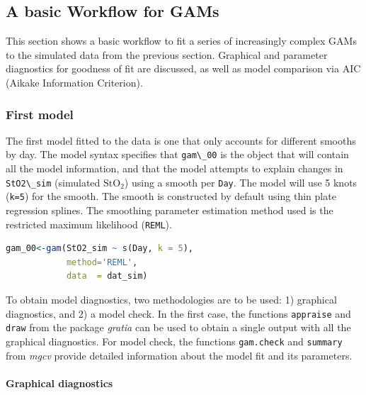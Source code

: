 \documentclass[
]{article}
\newcommand{\passthrough}[1]{#1}
\begin{document}
\hypertarget{workflow}{%
\subsection{A basic Workflow for GAMs}\label{workflow}}

This section shows a basic workflow to fit a series of increasingly complex GAMs to the simulated data from the previous section. Graphical and parameter diagnostics for goodness of fit are discussed, as well as model comparison via AIC (Aikake Information Criterion).

\hypertarget{first-model}{%
\subsubsection{First model}\label{first-model}}

The first model fitted to the data is one that only accounts for different smooths by day. The model syntax specifies that \passthrough{\lstinline!gam\_00!} is the object that will contain all the model information, and that the model attempts to explain changes in \passthrough{\lstinline!StO2\_sim!} (simulated \(\mbox{StO}_2\)) using a smooth per \passthrough{\lstinline!Day!}. The model will use 5 knots (\passthrough{\lstinline!k=5!}) for the smooth. The smooth is constructed by default using thin plate regression splines. The smoothing parameter estimation method used is the restricted maximum likelihood (\passthrough{\lstinline!REML!}).

\begin{lstlisting}[language=R]
gam_00<-gam(StO2_sim ~ s(Day, k = 5),
            method='REML',
            data  = dat_sim)
\end{lstlisting}

To obtain model diagnostics, two methodologies are to be used: 1) graphical diagnostics, and 2) a model check. In the first case, the functions \passthrough{\lstinline!appraise!} and \passthrough{\lstinline!draw!} from the package \emph{gratia} can be used to obtain a single output with all the graphical diagnostics. For model check, the functions \passthrough{\lstinline!gam.check!} and \passthrough{\lstinline!summary!} from \emph{mgcv} provide detailed information about the model fit and its parameters.



\hypertarget{graphical-diagnostics}{%
\paragraph{Graphical diagnostics}\label{graphical-diagnostics}}
\end{document}
